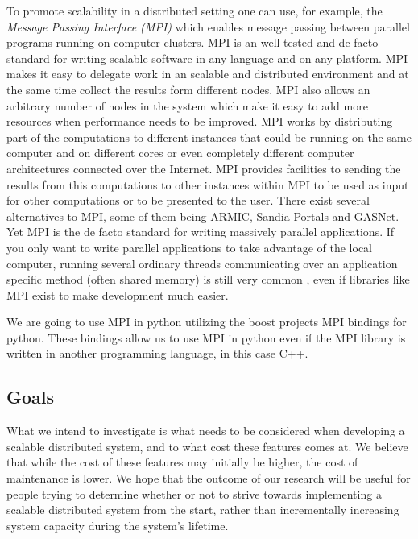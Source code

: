 \documentclass{article}
\begin{document}
To promote scalability in a distributed setting one can use, for example, the
\emph{Message Passing Interface (MPI)} which enables message passing between
parallel programs running on computer clusters. MPI is
an well tested and de facto\cite{wu2008using} standard for writing scalable
software in any language and on any platform. MPI makes it easy to delegate
work in an scalable and distributed environment and at the same time collect
the results form different nodes. MPI also allows an arbitrary number of nodes
in the system which make it easy to add more resources when performance needs to
be improved. \cite{gropp1996high}
\newline
MPI works by distributing part of the computations to different instances that
could be running on the same computer and on different cores or even completely
different computer architectures connected over the Internet. MPI provides
facilities to sending the results from this computations to other instances
within MPI to be used as input for other computations or to be presented to the
user. There exist several alternatives\cite{mpialternatives} to MPI, some of
them being ARMIC, Sandia Portals and GASNet. Yet MPI is the de facto
\cite{mpialternatives} standard for writing massively parallel applications. If
you only want to write parallel applications to take advantage of the local
computer, running several ordinary threads communicating over an application
specific method (often shared memory) is still very common \cite{getov1998high},
even if libraries like MPI exist to make development much easier.

We are going to use MPI in python utilizing the boost projects MPI bindings
for python. These bindings allow us to use MPI in python even if the MPI library
is written in another programming language, in this case C++.
 
\subsection{Goals} 

What we intend to investigate is what needs to be considered
when developing a scalable distributed system, and to what cost these features
comes at. We believe that while the cost of these features may initially be
higher, the cost of maintenance is lower. We hope that the outcome of our
research will be useful for people trying to determine whether or not to strive
towards implementing a scalable distributed system from the start, rather than
incrementally increasing system capacity during the system's lifetime.
\end{document}
